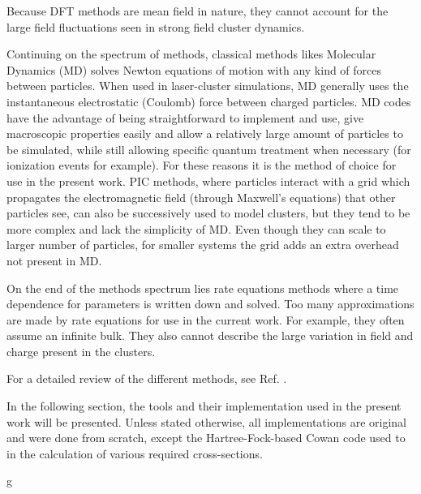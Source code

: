 
Because DFT methods are mean field in nature, they cannot account for the large
field fluctuations seen in strong field cluster dynamics.

Continuing on the spectrum of methods, classical methods likes Molecular
Dynamics (MD) solves Newton
equations of motion with any kind of forces between particles. When used in
laser-cluster simulations, MD generally uses the instantaneous electrostatic
(Coulomb) force between charged particles. MD codes have the advantage of being
straightforward
to implement and use, give macroscopic properties easily and allow a
relatively large amount of particles to be simulated, while still allowing
specific quantum treatment when necessary (for ionization events for example). For
these reasons it is the method of choice for use in the present work. 
%
PIC
methods, where particles interact with a grid which propagates the
electromagnetic field (through Maxwell's equations) that other particles see,
can also be successively used to model clusters\cite{Varin2012}, but they tend
to be more complex and lack the simplicity of MD. Even though they can scale to
larger number of particles, for smaller systems the grid 
adds
an extra overhead
not present in MD.


On the end of the methods spectrum lies rate equations methods where a time
dependence for parameters is written down and solved. Too many approximations
are made by rate equations for use in the current work. For example, they often
assume an infinite bulk. They also cannot describe the large variation in field
and charge present in the clusters.

For a detailed review of the different methods, see Ref. \cite{Fennel2010}.

In the following section, the tools and their implementation used in the present
work will be presented. Unless stated otherwise, all implementations are original
and were done from scratch, except the Hartree-Fock-based Cowan code\cite{CowanCode} used to
in the calculation of various required cross-sections.








g
